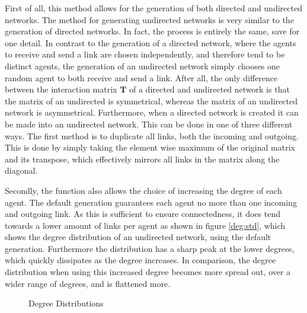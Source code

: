 \documentclass{article}
\newcommand{\T}{\textbf{T}}
\begin{document}
First of all, this method allows for the generation of both directed and undirected networks. The method for generating undirected networks is very similar to the generation of directed networks. In fact, the process is entirely the same, save for one detail. In contrast to the generation of a directed network, where the agents to receive and send a link are chosen independently, and therefore tend to be distinct agents, the generation of an undirected network simply chooses one random agent to both receive and send a link. After all, the only difference between the interaction matrix $\T$ of a directed and undirected network is that the matrix of an undirected is symmetrical, whereas the matrix of an undirected network is asymmetrical. \newline
Furthermore, when a directed network is created it can be made into an undirected network. This can be done in one of three different ways. The first method is to duplicate all links, both the incoming and outgoing. This is done by simply taking the element wise maximum of the original matrix and its transpose, which effectively mirrors all links in the matrix along the diagonal. \newline

Secondly, the function also allows the choice of increasing the degree of each agent. The default generation guarantees each agent no more than one incoming and outgoing link. As this is sufficient to ensure connectedness, it does tend towards a lower amount of links per agent as shown in figure \ref{deg:std}, which shows the degree distribution of an undirected network, using the default generation. Furthermore the distribution has a sharp peak at the lower degrees, which quickly dissipates as the degree increases. In comparison, the degree distribution when using this increased degree becomes more spread out, over a wider range of degrees, and is flattened more.

\begin{figure}[!htbp]
  \centering
  \hfill
  \caption{Degree Distributions}
\end{figure}
\end{document}
